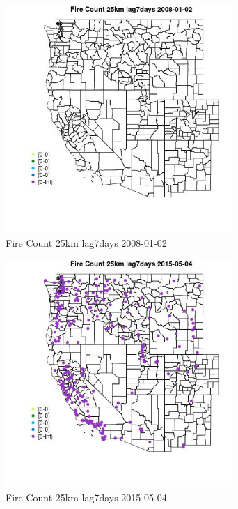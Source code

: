 \begin{figure} 
\centering  
\includegraphics[width=0.77\textwidth]{Code_Outputs/Report_ML_input_PM25_Step4_part_e_de_duplicated_aves_compiled_2019-05-18wNAs_MapObsFire_Count_25km_lag7days2008-01-02.jpg} 
\caption{\label{fig:Report_ML_input_PM25_Step4_part_e_de_duplicated_aves_compiled_2019-05-18wNAsMapObsFire_Count_25km_lag7days2008-01-02}Fire Count 25km lag7days 2008-01-02} 
\end{figure} 
 

\begin{figure} 
\centering  
\includegraphics[width=0.77\textwidth]{Code_Outputs/Report_ML_input_PM25_Step4_part_e_de_duplicated_aves_compiled_2019-05-18wNAs_MapObsFire_Count_25km_lag7days2015-05-04.jpg} 
\caption{\label{fig:Report_ML_input_PM25_Step4_part_e_de_duplicated_aves_compiled_2019-05-18wNAsMapObsFire_Count_25km_lag7days2015-05-04}Fire Count 25km lag7days 2015-05-04} 
\end{figure} 
 

